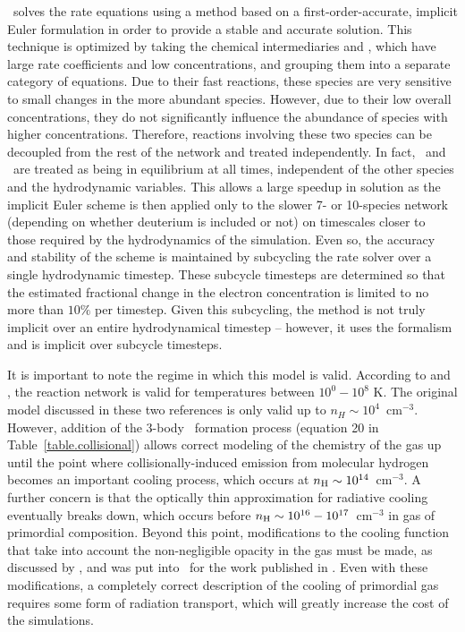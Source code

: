 \enzo\ solves the rate equations using a method based on a first-order-accurate, implicit
Euler formulation in order to provide a stable and accurate
solution. This technique is optimized by taking the chemical
intermediaries \Hm and \HHp, which have large rate coefficients and
low concentrations, and grouping them into a separate category of
equations.  Due to their fast reactions, these species are very
sensitive to small changes in the more abundant species.  However, due
to their low overall concentrations, they do not significantly
influence the abundance of species with higher concentrations.
Therefore, reactions involving these two species can be decoupled from
the rest of the network and treated independently.  In fact, \Hm~and
\HHp~are treated as being in equilibrium at all times, independent of
the other species and the hydrodynamic variables.  This allows a large
speedup in solution as the implicit Euler scheme is then applied only to the
slower 7- or 10-species network (depending on whether deuterium is
included or not) on timescales closer to those required by the
hydrodynamics of the simulation.  Even so, the accuracy and stability
of the scheme is maintained by subcycling the rate solver over a
single hydrodynamic timestep.  These subcycle timesteps are determined
so that the estimated fractional change in the electron concentration
is limited to no more than $10\%$ per timestep.  Given this
subcycling, the method is not truly implicit over an entire
hydrodynamical timestep  -- however,
it uses the formalism and is implicit over subcycle timesteps.

It is important to note the regime in which this model is valid.
According to \citet{abel97} and \citet{anninos97},
the reaction network is valid for temperatures between $10^0 - 10^8$
K.  The original model discussed in these two references is only valid
up to $n_H \sim 10^4$~cm$^{-3}$.  However, addition of the 3-body
\HH~formation process (equation 20 in Table~\ref{table.collisional})
allows correct modeling of the chemistry of the gas up until the point
where collisionally-induced emission from molecular hydrogen becomes
an important cooling process, which occurs at $n_{\rm H} \sim
10^{14}$~cm$^{-3}$.  A further concern is that the optically thin
approximation for radiative cooling eventually breaks down, which occurs before
$n_{\rm H} \sim 10^{16} - 10^{17}$~cm$^{-3}$ in gas of primordial composition.  Beyond this point,
modifications to the cooling function that take into account the
non-negligible opacity in the gas must be made, as discussed by
\citet{2004MNRAS.348.1019R}, and was put into \enzo\ for the work
published in \citep{2009Sci...325..601T,2009PhDT.........5T}.  Even
with these modifications, a completely correct description of the
cooling of primordial gas requires some form of radiation transport,
which will greatly increase the cost of the simulations.

